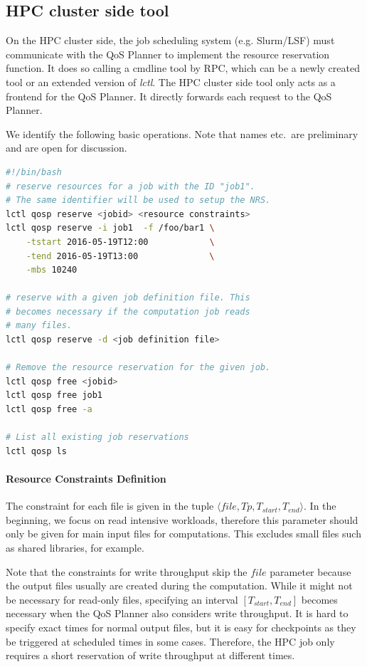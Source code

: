 \documentclass[10pt]{article}
\begin{document}
\subsection{HPC cluster side tool}
On the HPC cluster side, the job scheduling system (e.g. Slurm/LSF) must communicate with the QoS Planner to implement the resource reservation function.
It does so calling a cmdline tool by RPC, which can be a newly created tool or an extended version of \emph{lctl}.
The HPC cluster side tool only acts as a frontend for the QoS Planner.
It directly forwards each request to the QoS Planner.

We identify the following basic operations.
Note that names etc.\ are preliminary and are open for discussion.





\begin{lstlisting}[language=bash,caption={Example lctl calls}]
#!/bin/bash
# reserve resources for a job with the ID "job1".
# The same identifier will be used to setup the NRS.
lctl qosp reserve <jobid> <resource constraints>
lctl qosp reserve -i job1  -f /foo/bar1 \
    -tstart 2016-05-19T12:00            \
    -tend 2016-05-19T13:00              \
    -mbs 10240

# reserve with a given job definition file. This 
# becomes necessary if the computation job reads 
# many files.
lctl qosp reserve -d <job definition file>

# Remove the resource reservation for the given job.
lctl qosp free <jobid>
lctl qosp free job1
lctl qosp free -a

# List all existing job reservations
lctl qosp ls
\end{lstlisting}

\paragraph{Resource Constraints Definition}
The constraint for each file is given in the tuple $\langle file, Tp, T_{start}, T_{end}\rangle$.
In the beginning, we focus on read intensive workloads, therefore this parameter should only be given for main input files for computations.
This excludes small files such as shared libraries, for example.

Note that the constraints for write throughput skip the $file$ parameter because the output files usually are created during the computation.
While it might not be necessary for read-only files, specifying an interval $[T_{start}, T_{end}]$ becomes necessary when the QoS Planner also considers write throughput.
It is hard to specify exact times for normal output files, but it is easy for checkpoints as they be triggered at scheduled times in some cases.
Therefore, the HPC job only requires a short reservation of write throughput at different times.
\end{document}
